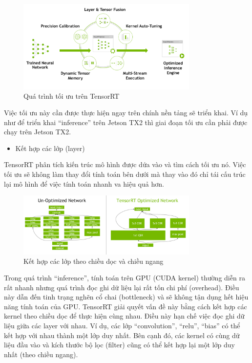 \documentclass[a4paper]{report}
\begin{document}
\begin{figure}[h!]
	\centering
	\includegraphics[width=0.8\textwidth]{4_2_optim.png}
	\caption{Quá trình tối ưu trên TensorRT}
\end{figure}

Việc tối ưu này cần được thực hiện ngay trên chính nền tảng sẽ triển khai. Ví dụ như để triển khai “inference” trên Jetson TX2 thì giai đoạn tối ưu cần phải được chạy trên Jetson TX2.
\begin{itemize}
	\item Kết hợp các lớp (layer)

\end{itemize}

TensorRT phân tích kiến trúc mô hình được dứa vào và tìm cách tối ưu nó. Việc tối ưu sẽ không làm thay đổi tính toán bên dưới mà thay vào đó chỉ tái cấu trúc lại mô hình để việc tính toán nhanh va hiệu quả hơn.
\begin{figure}[h!]
	\centering
	\includegraphics[width=0.8\textwidth]{4_2_combine.png}
	\caption{Kết hợp các lớp theo chiều dọc và chiều ngang}
\end{figure}

Trong quá trình “inference”, tính toán trên GPU (CUDA kernel) thường diễn ra rất nhanh nhưng quá trình đọc ghi dữ liệu lại rất tốn chi phí (overhead). Điều này dẫn đến tinh trạng nghẽn cổ chai (bottleneck) và sẽ không tận dụng hết hiệu năng tính toán của GPU. TensorRT giải quyết vấn đề này bằng cách kết hợp các kernel theo chiều dọc để thực hiện cùng nhau. Điều này hạn chế việc đọc ghi dữ liệu giữa các layer với nhau. Ví dụ, các lớp “convolution”, “relu”, “bias” có thể kết hợp với nhau thành một lớp duy nhất. Bên cạnh đó, các kernel có cùng dữ liệu đầu vào và kích thước bộ lọc (filter) cũng có thể kết hợp lại một lớp duy nhất (theo chiều ngang). \\
\end{document}
